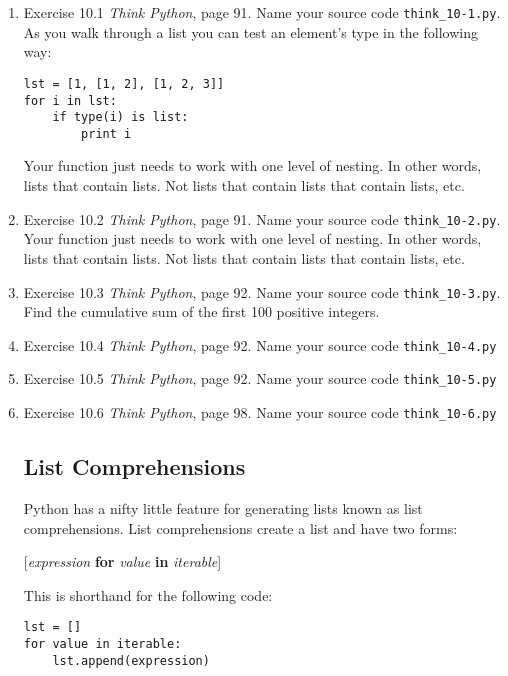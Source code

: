 \documentclass[12pt]{article}
\begin{document}
\begin{enumerate}
  \item Exercise 10.1 \emph{Think Python}, page 91. Name your source code \texttt{think\_10-1.py}. As you walk through a list you can test an element's type in the following way:

\begin{verbatim}
lst = [1, [1, 2], [1, 2, 3]]
for i in lst:
    if type(i) is list:
        print i
    \end{verbatim}

Your function just needs to work with one level of nesting. In other words, lists that contain lists. Not lists that contain lists that contain lists, etc.

\item Exercise 10.2 \emph{Think Python}, page 91. Name your source code \texttt{think\_10-2.py}. Your function just needs to work with one level of nesting. In other words, lists that contain lists. Not lists that contain lists that contain lists, etc.


\item Exercise 10.3 \emph{Think Python}, page 92. Name your source code \texttt{think\_10-3.py}. Find the cumulative sum of the first 100 positive integers.

\item Exercise 10.4 \emph{Think Python}, page 92. Name your source code \texttt{think\_10-4.py}

\item Exercise 10.5 \emph{Think Python}, page 92. Name your source code \texttt{think\_10-5.py}

\item Exercise 10.6 \emph{Think Python}, page 98. Name your source code \texttt{think\_10-6.py}


\subsection*{List Comprehensions}
Python has a nifty little feature for generating lists known as list comprehensions. List comprehensions create a list and have two forms: 

[\emph{expression} \textbf{for} \emph{value} \textbf{in} \emph{iterable}]

This is shorthand for the following code:

\begin{verbatim}
lst = []
for value in iterable:
    lst.append(expression)
\end{verbatim}


\end{enumerate}
\end{document}
